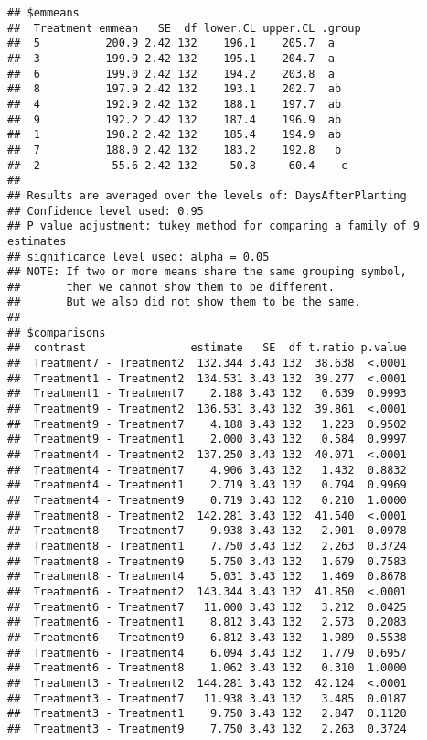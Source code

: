\documentclass[
  12pt,
]{article}
\begin{document}
\begin{verbatim}
## $emmeans
##  Treatment emmean   SE  df lower.CL upper.CL .group
##  5          200.9 2.42 132    196.1    205.7  a    
##  3          199.9 2.42 132    195.1    204.7  a    
##  6          199.0 2.42 132    194.2    203.8  a    
##  8          197.9 2.42 132    193.1    202.7  ab   
##  4          192.9 2.42 132    188.1    197.7  ab   
##  9          192.2 2.42 132    187.4    196.9  ab   
##  1          190.2 2.42 132    185.4    194.9  ab   
##  7          188.0 2.42 132    183.2    192.8   b   
##  2           55.6 2.42 132     50.8     60.4    c  
## 
## Results are averaged over the levels of: DaysAfterPlanting 
## Confidence level used: 0.95 
## P value adjustment: tukey method for comparing a family of 9 estimates 
## significance level used: alpha = 0.05 
## NOTE: If two or more means share the same grouping symbol,
##       then we cannot show them to be different.
##       But we also did not show them to be the same. 
## 
## $comparisons
##  contrast                estimate   SE  df t.ratio p.value
##  Treatment7 - Treatment2  132.344 3.43 132  38.638  <.0001
##  Treatment1 - Treatment2  134.531 3.43 132  39.277  <.0001
##  Treatment1 - Treatment7    2.188 3.43 132   0.639  0.9993
##  Treatment9 - Treatment2  136.531 3.43 132  39.861  <.0001
##  Treatment9 - Treatment7    4.188 3.43 132   1.223  0.9502
##  Treatment9 - Treatment1    2.000 3.43 132   0.584  0.9997
##  Treatment4 - Treatment2  137.250 3.43 132  40.071  <.0001
##  Treatment4 - Treatment7    4.906 3.43 132   1.432  0.8832
##  Treatment4 - Treatment1    2.719 3.43 132   0.794  0.9969
##  Treatment4 - Treatment9    0.719 3.43 132   0.210  1.0000
##  Treatment8 - Treatment2  142.281 3.43 132  41.540  <.0001
##  Treatment8 - Treatment7    9.938 3.43 132   2.901  0.0978
##  Treatment8 - Treatment1    7.750 3.43 132   2.263  0.3724
##  Treatment8 - Treatment9    5.750 3.43 132   1.679  0.7583
##  Treatment8 - Treatment4    5.031 3.43 132   1.469  0.8678
##  Treatment6 - Treatment2  143.344 3.43 132  41.850  <.0001
##  Treatment6 - Treatment7   11.000 3.43 132   3.212  0.0425
##  Treatment6 - Treatment1    8.812 3.43 132   2.573  0.2083
##  Treatment6 - Treatment9    6.812 3.43 132   1.989  0.5538
##  Treatment6 - Treatment4    6.094 3.43 132   1.779  0.6957
##  Treatment6 - Treatment8    1.062 3.43 132   0.310  1.0000
##  Treatment3 - Treatment2  144.281 3.43 132  42.124  <.0001
##  Treatment3 - Treatment7   11.938 3.43 132   3.485  0.0187
##  Treatment3 - Treatment1    9.750 3.43 132   2.847  0.1120
##  Treatment3 - Treatment9    7.750 3.43 132   2.263  0.3724

\end{verbatim}
\end{document}

